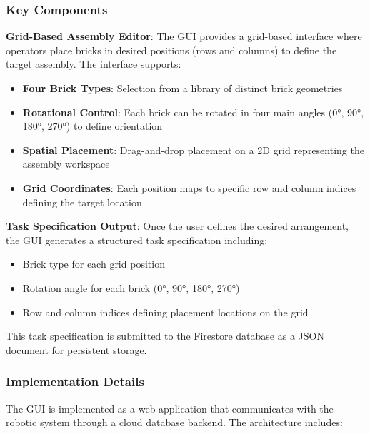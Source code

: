 \subsubsection{Key Components}

\textbf{Grid-Based Assembly Editor}: The GUI provides a grid-based interface where operators place bricks in desired positions (rows and columns) to define the target assembly. The interface supports:
\begin{itemize}
    \item \textbf{Four Brick Types}: Selection from a library of distinct brick geometries
    \item \textbf{Rotational Control}: Each brick can be rotated in four main angles (0°, 90°, 180°, 270°) to define orientation
    \item \textbf{Spatial Placement}: Drag-and-drop placement on a 2D grid representing the assembly workspace
    \item \textbf{Grid Coordinates}: Each position maps to specific row and column indices defining the target location
\end{itemize}

\textbf{Task Specification Output}: Once the user defines the desired arrangement, the GUI generates a structured task specification including:
\begin{itemize}
    \item Brick type for each grid position
    \item Rotation angle for each brick (0°, 90°, 180°, 270°)
    \item Row and column indices defining placement locations on the grid
\end{itemize}

This task specification is submitted to the Firestore database as a JSON document for persistent storage.

\subsubsection{Implementation Details}
The GUI is implemented as a web application that communicates with the robotic system through a cloud database backend. The architecture includes:

